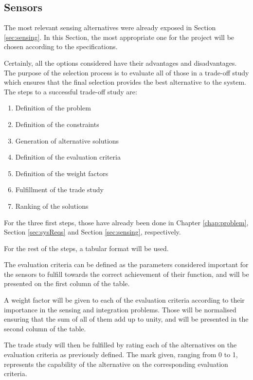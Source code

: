 \subsection{Sensors}

The most relevant sensing alternatives were already exposed in Section \ref{sec:sensing}.
In this Section, the most appropriate one for the project will be chosen according to the specifications.

Certainly, all the options considered have their advantages and disadvantages.
The purpose of the selection process is to evaluate all of those in a trade-off study which ensures that the final selection provides the best alternative to the system.
The steps to a successful trade-off study are:
\begin{enumerate}
	\item Definition of the problem
	\item Definition of the constraints
	\item Generation of alternative solutions
	\item Definition of the evaluation criteria
	\item Definition of the weight factors
	\item Fulfillment of the trade study
	\item Ranking of the solutions
\end{enumerate}

For the three first steps, those have already been done in Chapter \ref{chap:problem}, Section \ref{sec:sysReqs} and Section \ref{sec:sensing}, respectively.

For the rest of the steps, a tabular format will be used.

The evaluation criteria can be defined as the parameters considered important for the sensors to fulfill towards the correct achievement of their function, and will be presented on the first column of the table.

A weight factor will be given to each of the evaluation criteria according to their importance in the sensing and integration problems.
Those will be normalised ensuring that the sum of all of them add up to unity, and will be presented in the second column of the table.

The trade study will then be fulfilled by rating each of the alternatives on the evaluation criteria as previously defined.
The mark given, ranging from 0 to 1, represents the capability of the alternative on the corresponding evaluation criteria.


